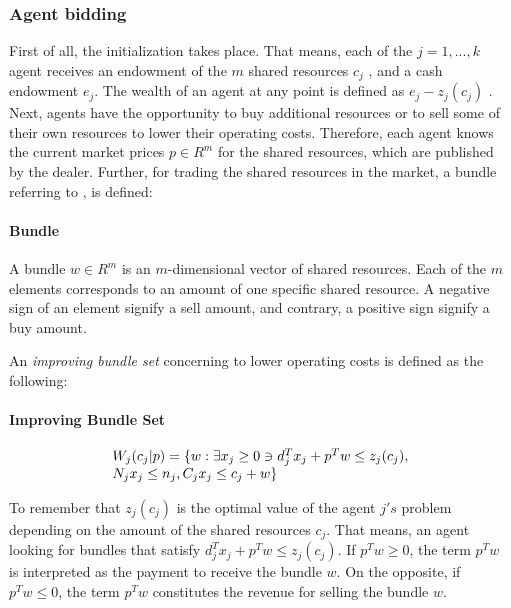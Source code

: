 \subsubsection{Agent bidding}
First of all, the initialization takes place. That means, each of the $j=1, ..., k$ agent receives an
endowment of the $m$ shared resources $c_{j}$ , and a cash endowment $e_{j}$.
The wealth of an agent at any point is defined as $e_{j} - z_{j}(c_{j})$ .
Next, agents have the opportunity to buy additional resources or to sell some of their own resources 
to lower their operating costs. 
Therefore, each agent knows the current market prices $p \in R^{m}$ for the shared resources, 
which are published by the dealer. Further, for trading the shared resources in the market, 
a bundle referring to , is defined:

\paragraph*{Bundle} A bundle $w \in R^{m}$ is an $m$-dimensional vector of shared resources. 
Each of the $m$ elements corresponds to an amount of one specific shared resource. 
A negative sign of an element signify a sell amount, 
and contrary, a positive sign signify a buy amount. \newline


An \textit{improving bundle set} concerning to lower operating costs is defined as the following:

\paragraph*{Improving Bundle Set}
\begin{equation}
    \begin{array}{ll@{}ll}
        W_{j}(c_{j}|p) = \{w: \exists x_{j} \geq 0 \ni d_{j}^{T}x_{j} + p^{T}w \leq z_{j}(c_{j}), \\
        N_{j}x_{j} \leq n_{j}, C_{j}x_{j} \leq c_{j}+w \}
    \end{array}
\end{equation}

To remember that $z_{j}(c_{j})$ is the optimal value of the agent $j's$ problem 
depending on the amount of the shared resources $c_{j}$. 
That means, an agent looking for bundles that satisfy 
$d_{j}^{T}x_{j} + p^{T}w \leq z_{j}(c_{j})$. If 
$p^{T}w \geq 0$, the term $p^{T}w$ is interpreted as the payment to receive the bundle $w$.
On the opposite, if $p^{T}w \leq 0$, the term $p^{T}w$ constitutes the revenue for selling the bundle $w$.


